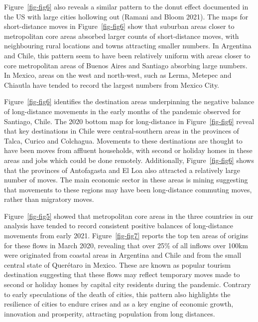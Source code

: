 \documentclass[
  11pt,
]{article}
\begin{document}
Figure~\ref{fig-fig6} also reveals a similar pattern to the donut effect
documented in the US with large cities hollowing out (Ramani and Bloom
2021). The maps for short-distance moves in Figure~\ref{fig-fig6} show
that suburban areas closer to metropolitan core areas absorbed larger
counts of short-distance moves, with neighbouring rural locations and
towns attracting smaller numbers. In Argentina and Chile, this pattern
seem to have been relatively uniform with areas closer to core
metropolitan areas of Buenos Aires and Santiago absorbing large numbers.
In Mexico, areas on the west and north-west, such as Lerma, Metepec and
Chiautla have tended to record the largest numbers from Mexico City.

Figure~\ref{fig-fig6} identifies the destination areas underpinning the
negative balance of long-distance movements in the early months of the
pandemic observed for Santiago, Chile. The 2020 bottom map for
long-distance in Figure~\ref{fig-fig6} reveal that key destinations in
Chile were central-southern areas in the provinces of Talca, Curico and
Colchagua. Movements to these destinations are thought to have been
moves from affluent households, with second or holiday homes in these
areas and jobs which could be done remotely. Additionally,
Figure~\ref{fig-fig6} shows that the provinces of Antofagasta and El Loa
also attracted a relatively large number of moves. The main economic
sector in these areas is mining suggesting that movements to these
regions may have been long-distance commuting moves, rather than
migratory moves.

Figure~\ref{fig-fig5} showed that metropolitan core areas in the three
countries in our analysis have tended to record consistent positive
balances of long-distance movements from early 2021.
Figure~\ref{fig-fig7} reports the top ten areas of origins for these
flows in March 2020, revealing that over 25\% of all inflows over 100km
were originated from coastal areas in Argentina and Chile and from the
small central state of Querétaro in Mexico. These are known as popular
tourism destination suggesting that these flows may reflect temporary
moves made to second or holiday homes by capital city residents during
the pandemic. Contrary to early speculations of the death of cities,
this pattern also highlights the resilience of cities to endure crises
and as a key engine of economic growth, innovation and prosperity,
attracting population from long distances.
\end{document}
